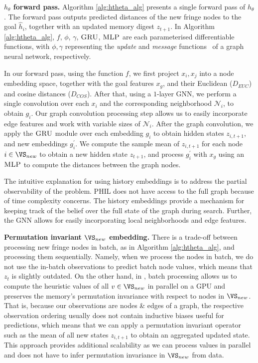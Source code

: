 \textbf{$h_{\theta}$ forward pass.}  Algorithm \ref{alg:htheta_alg} presents a single forward pass of $h_{\theta}$. The forward pass outputs predicted distances of the new fringe nodes to the goal $\hat{h}_i$, together with an updated memory digest $z_{t+1}$. In Algorithm \ref{alg:htheta_alg}, $f$, $\phi$, $\gamma$, $\textsc{GRU}$\cite{cho-etal-2014-learning}, $\textsc{MLP}$ are each parameterised differentiable functions, with $\phi, \gamma$ representing the \textit{update} and \textit{message} functions~\cite{gilmer2017neural} of a graph neural network, respectively.

In our forward pass, using the function $f$, we first project $x_i, x_j$ into a node embedding space, together with the goal features $x_g$, and their Euclidean ($D_{EUC}$) and cosine distances ($D_{COS}$). After that, using a $1$-layer GNN, we perform a single convolution over each $x_i$ and the corresponding neighborhood $\mathcal{N}_i$, to obtain $g_i$. Our graph convolution processing step allows us to easily incorporate edge features and work with variable sizes of $\mathcal{N}_i$. After the graph convolution, we apply the $\textsc{GRU}$ module over each embedding $g_i$ to obtain hidden states $z_{i, t+1}$, and new embeddings $g^{\prime}_i$. We compute the sample mean of $z_{i, t+1}$ for each node $i \in \VS_{new}$ to obtain a new hidden state $z_{t+1}$, and process $g^{\prime}_i$ with $x_g$ using an $\textsc{MLP}$ to compute the distances between the graph nodes. 

The intuitive explanation for using history embeddings is to address the partial observability of the problem. PHIL does not have access to the full graph because of time complexity concerns. The history embeddings provide a mechanism for keeping track of the belief over the full state of the graph during search. Further, the GNN allows for easily incorporating local neighborhoods and edge features.

\textbf{Permutation invariant $\VS_{new}$ embedding.} There is a trade-off between processing new fringe nodes in batch, as in Algorithm \ref{alg:htheta_alg}, and processing them sequentially. Namely, when we process the nodes in batch, we do not use the in-batch observations to predict batch node values, which means that $z_t$ is slightly outdated. On the other hand, in \phil, batch processing allows us to compute the heuristic values of all $v \in \VS_{new}$ in parallel on a GPU and preserves the memory's permutation invariance with respect to nodes in $\VS_{new}$. That is, because our observations are nodes \& edges of a graph, the respective observation ordering usually does not contain inductive biases useful for predictions, which means that we can apply a permutation invariant operator such as the mean of all new states $z_{i, t+1}$ to obtain an aggregated updated state. This approach provides additional scalability as we can process values in parallel and \phil does not have to infer permutation invariance in $ \VS_{new}$ from data.

